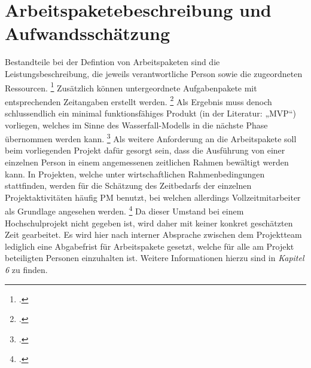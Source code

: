 \section{Arbeitspaketebeschreibung und Aufwandsschätzung}
Bestandteile bei der Defintion von Arbeitspaketen sind die Leistungsbeschreibung, die jeweils verantwortliche Person
sowie die zugeordneten Ressourcen.
\footcite[Vgl.][73]{gadatschGrundkursITProjektcontrollingGrundlagen2008}
Zusätzlich können untergeordnete Aufgabenpakete mit entsprechenden Zeitangaben erstellt werden.
\footcite[Vgl.][74]{gadatschGrundkursITProjektcontrollingGrundlagen2008}
Als Ergebnis muss denoch schlussendlich ein minimal funktionsfähiges Produkt (in der Literatur: „\ac{MVP}“)
vorliegen, welches im Sinne des Wasserfall-Modells in die nächste Phase übernommen werden kann.
\footcite[Vgl.][52]{panagosToolsUndMassnahmen2019}
Als weitere Anforderung an die Arbeitspakete soll beim vorliegenden Projekt dafür gesorgt sein, dass die Ausführung
von einer einzelnen Person in einem angemessenen zeitlichen Rahmen bewältigt werden kann.
In Projekten, welche unter wirtschaftlichen Rahmenbedingungen stattfinden, werden für die Schätzung des Zeitbedarfs
der einzelnen Projektaktivitäten häufig \ac{PM} benutzt, bei welchen allerdings Vollzeitmitarbeiter als Grundlage
angesehen werden.
\footcite[Vgl.][74]{gadatschGrundkursITProjektcontrollingGrundlagen2008}
Da dieser Umstand bei einem Hochschulprojekt nicht gegeben ist, wird daher mit keiner konkret geschätzten Zeit
gearbeitet. Es wird hier nach interner Absprache zwischen dem Projektteam lediglich eine Abgabefrist für
Arbeitspakete gesetzt, welche für alle am Projekt beteiligten Personen einzuhalten ist. Weitere Informationen
hierzu sind in \textit{Kapitel 6} zu finden.
